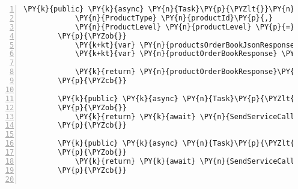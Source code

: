 \begin{Verbatim}[commandchars=\\\{\},numbers=left,firstnumber=1,stepnumber=1,numberblanklines=0]
        \PY{k}{public} \PY{k}{async} \PY{n}{Task}\PY{p}{\PYZlt{}}\PY{n}{ProductsOrderBookResponse}\PY{p}{\PYZgt{}} \PY{n}{GetProductOrderBookAsync}\PY{p}{(}
			\PY{n}{ProductType} \PY{n}{productId}\PY{p}{,}
			\PY{n}{ProductLevel} \PY{n}{productLevel} \PY{p}{=} \PY{n}{ProductLevel}\PY{p}{.}\PY{n}{One}\PY{p}{)}
        \PY{p}{\PYZob{}}
            \PY{k+kt}{var} \PY{n}{productsOrderBookJsonResponse} \PY{p}{=} \PY{k}{await} \PY{n}{SendServiceCall}\PY{p}{\PYZlt{}}\PY{n}{ProductsOrderBookJsonResponse}\PY{p}{\PYZgt{}}\PY{p}{(}\PY{n}{HttpMethod}\PY{p}{.}\PY{n}{Get}\PY{p}{,} \PY{err}{\PYZdl{}}\PY{l+s}{\PYZdq{}/products/\PYZob{}productId.GetEnumMemberValue()\PYZcb{}/book/?level=\PYZob{}(int) productLevel\PYZcb{}\PYZdq{}}\PY{p}{)}\PY{p}{.}\PY{n}{ConfigureAwait}\PY{p}{(}\PY{k}{false}\PY{p}{)}\PY{p}{;}
            \PY{k+kt}{var} \PY{n}{productOrderBookResponse} \PY{p}{=} \PY{n}{ConvertProductOrderBookResponse}\PY{p}{(}\PY{n}{productsOrderBookJsonResponse}\PY{p}{,} \PY{n}{productLevel}\PY{p}{)}\PY{p}{;}

            \PY{k}{return} \PY{n}{productOrderBookResponse}\PY{p}{;}
        \PY{p}{\PYZcb{}}

        \PY{k}{public} \PY{k}{async} \PY{n}{Task}\PY{p}{\PYZlt{}}\PY{n}{ProductTicker}\PY{p}{\PYZgt{}} \PY{n}{GetProductTickerAsync}\PY{p}{(}\PY{n}{ProductType} \PY{n}{productId}\PY{p}{)}
        \PY{p}{\PYZob{}}
            \PY{k}{return} \PY{k}{await} \PY{n}{SendServiceCall}\PY{p}{\PYZlt{}}\PY{n}{ProductTicker}\PY{p}{\PYZgt{}}\PY{p}{(}\PY{n}{HttpMethod}\PY{p}{.}\PY{n}{Get}\PY{p}{,} \PY{err}{\PYZdl{}}\PY{l+s}{\PYZdq{}/products/\PYZob{}productId.GetEnumMemberValue()\PYZcb{}/ticker\PYZdq{}}\PY{p}{)}\PY{p}{.}\PY{n}{ConfigureAwait}\PY{p}{(}\PY{k}{false}\PY{p}{)}\PY{p}{;}
        \PY{p}{\PYZcb{}}

        \PY{k}{public} \PY{k}{async} \PY{n}{Task}\PY{p}{\PYZlt{}}\PY{n}{ProductStats}\PY{p}{\PYZgt{}} \PY{n}{GetProductStatsAsync}\PY{p}{(}\PY{n}{ProductType} \PY{n}{productId}\PY{p}{)}
        \PY{p}{\PYZob{}}
            \PY{k}{return} \PY{k}{await} \PY{n}{SendServiceCall}\PY{p}{\PYZlt{}}\PY{n}{ProductStats}\PY{p}{\PYZgt{}}\PY{p}{(}\PY{n}{HttpMethod}\PY{p}{.}\PY{n}{Get}\PY{p}{,} \PY{err}{\PYZdl{}}\PY{l+s}{\PYZdq{}/products/\PYZob{}productId.GetEnumMemberValue()\PYZcb{}/stats\PYZdq{}}\PY{p}{)}\PY{p}{.}\PY{n}{ConfigureAwait}\PY{p}{(}\PY{k}{false}\PY{p}{)}\PY{p}{;}
        \PY{p}{\PYZcb{}}


\end{Verbatim}
